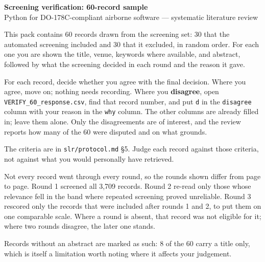 \documentclass[11pt,a4paper]{article}
\begin{document}
\begin{center}
{\large\bfseries Screening verification: 60-record sample}\\[2mm]
{\color{soft}Python for DO-178C-compliant airborne software --- systematic literature review}
\end{center}
\vspace{4mm}

This pack contains 60 records drawn from the screening set: 30 that the automated screening
included and 30 that it excluded, in random order. For each one you are shown the title,
venue, keywords where available, and abstract, followed by what the screening decided in
each round and the reason it gave.

For each record, decide whether you agree with the final decision. Where you agree, move on;
nothing needs recording. Where you \textbf{disagree}, open
\texttt{VERIFY\_60\_response.csv}, find that record number, and put \texttt{d} in the
\texttt{disagree} column with your reason in the \texttt{why} column. The other columns are
already filled in; leave them alone. Only the disagreements are of interest, and the review reports how many of the
60 were disputed and on what grounds.

The criteria are in \texttt{slr/protocol.md} \S5. Judge each record against those criteria,
not against what you would personally have retrieved.

Not every record went through every round, so the rounds shown differ from page to page.
Round 1 screened all 3{,}709 records. Round 2 re-read only those whose relevance fell in the
band where repeated screening proved unreliable. Round 3 rescored only the records that were
included after rounds 1 and 2, to put them on one comparable scale. Where a round is absent,
that record was not eligible for it; where two rounds disagree, the later one stands.

\vspace{3mm}
{\color{soft}\footnotesize Records without an abstract are marked as such: 8 of the 60 carry
a title only, which is itself a limitation worth noting where it affects your judgement.}
\clearpage
\end{document}
